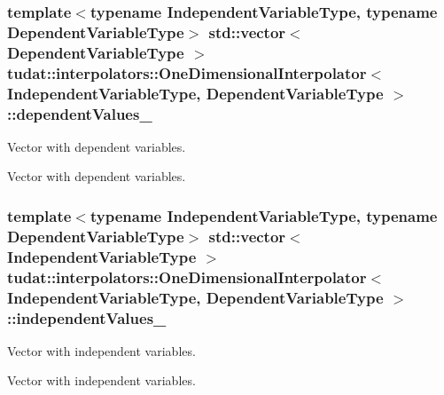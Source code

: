 \subsubsection[{\texorpdfstring{dependent\+Values\+\_\+}{dependentValues_}}]{\setlength{\rightskip}{0pt plus 5cm}template$<$typename Independent\+Variable\+Type, typename Dependent\+Variable\+Type$>$ std\+::vector$<$ Dependent\+Variable\+Type $>$ {\bf tudat\+::interpolators\+::\+One\+Dimensional\+Interpolator}$<$ Independent\+Variable\+Type, Dependent\+Variable\+Type $>$\+::dependent\+Values\+\_\+\hspace{0.3cm}{\ttfamily [protected]}}\hypertarget{classtudat_1_1interpolators_1_1OneDimensionalInterpolator_aabbc1fda1543131d0e6bf62bcd377839}{}\label{classtudat_1_1interpolators_1_1OneDimensionalInterpolator_aabbc1fda1543131d0e6bf62bcd377839}


Vector with dependent variables. 

Vector with dependent variables. 
\subsubsection[{\texorpdfstring{independent\+Values\+\_\+}{independentValues_}}]{\setlength{\rightskip}{0pt plus 5cm}template$<$typename Independent\+Variable\+Type, typename Dependent\+Variable\+Type$>$ std\+::vector$<$ Independent\+Variable\+Type $>$ {\bf tudat\+::interpolators\+::\+One\+Dimensional\+Interpolator}$<$ Independent\+Variable\+Type, Dependent\+Variable\+Type $>$\+::independent\+Values\+\_\+\hspace{0.3cm}{\ttfamily [protected]}}\hypertarget{classtudat_1_1interpolators_1_1OneDimensionalInterpolator_a283eacac87aef562273161b6d42c77f6}{}\label{classtudat_1_1interpolators_1_1OneDimensionalInterpolator_a283eacac87aef562273161b6d42c77f6}


Vector with independent variables. 

Vector with independent variables. 

